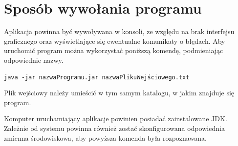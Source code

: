 \documentclass{article}
\begin{document}
\section{Sposób wywołania programu}
{\fontsize{12}{12}\selectfont
    Aplikacja powinna być wywoływana w konsoli, ze względu na brak interfejsu graficznego oraz wyświetlające się ewentualne komunikaty o błędach. Aby uruchomić program można wykorzystać poniższą komendę, podmieniając odpowiednie nazwy.
    
    \begin{center}
        \texttt{java -jar nazwaProgramu.jar nazwaPlikuWejściowego.txt} 
    \end{center}
  
   
    \setlength{\parindent}{0pt}
    Plik wejściowy należy umieścić w tym samym katalogu, w jakim znajduje się program.
    \setlength{\parindent}{12pt}
    \newline
    
    Komputer uruchamiający aplikacje powinien posiadać zainstalowane JDK. Zależnie od systemu powinna również zostać skonfigurowana odpowiednia zmienna środowiskowa, aby powyższa komenda była rozpoznawana.
}

    
\end{document}
